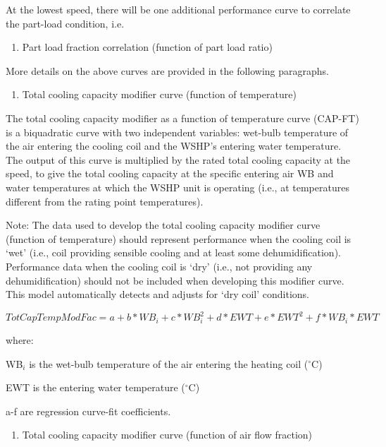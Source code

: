 At the lowest speed, there will be one additional performance curve to correlate the part-load condition, i.e.

\begin{enumerate}
\def\labelenumi{\arabic{enumi})}
\setcounter{enumi}{7}
\item Part load fraction correlation (function of part load ratio)
\end{enumerate}

More details on the above curves are provided in the following paragraphs.

\begin{enumerate}
\def\labelenumi{\arabic{enumi})}
\item Total cooling capacity modifier curve (function of temperature)
\end{enumerate}

The total cooling capacity modifier as a function of temperature curve (CAP-FT) is a biquadratic curve with two independent variables: wet-bulb temperature of the air entering the cooling coil and the WSHP's entering water temperature. The output of this curve is multiplied by the rated total cooling capacity at the speed, to give the total cooling capacity at the specific entering air WB and water temperatures at which the WSHP unit is operating (i.e., at temperatures different from the rating point temperatures).

Note: The data used to develop the total cooling capacity modifier curve (function of temperature) should represent performance when the cooling coil is `wet' (i.e., coil providing sensible cooling and at least some dehumidification). Performance data when the cooling coil is `dry' (i.e., not providing any dehumidification) should not be included when developing this modifier curve. This model automatically detects and adjusts for `dry coil' conditions.

\begin{equation}
TotCapTempModFac = a + b*W{B_i} + c*WB_i^2 + d*EWT + e*EW{T^2} + f*W{B_i}*EWT
\end{equation}

where:

WB\(_{i}\) is the wet-bulb temperature of the air entering the heating coil (\(^{\circ}\)C)

EWT is the entering water temperature (\(^{\circ}\)C)

a-f are regression curve-fit coefficients.

\begin{enumerate}
\def\labelenumi{\arabic{enumi})}
\setcounter{enumi}{1}
\item Total cooling capacity modifier curve (function of air flow fraction)
\end{enumerate}

